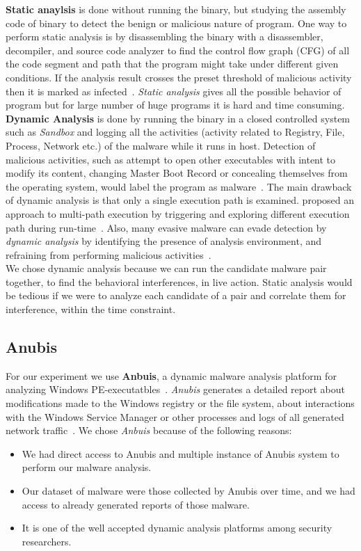 \textbf{Static anaylsis} is done without running the binary, but studying the assembly code of binary to detect the benign or malicious nature of program.
One way to perform static analysis is by disassembling the binary with a disassembler, decompiler, and source code analyzer to find the control flow graph (CFG) of all the code segment and path that the program might take under different given conditions.
If the analysis result crosses the preset threshold of malicious activity then it is marked as infected~\cite[]{sharma2014}.
\emph{Static analysis} gives all the possible behavior of program but for large number of huge programs it is hard and time consuming.\\

\textbf{Dynamic Analysis} is done by running the binary in a closed controlled system such as \emph{Sandbox} and logging all the activities (activity related to Registry, File, Process, Network etc.) of the malware while it runs in host.
Detection of malicious activities, such as attempt to open other executables with intent to modify its content, changing Master Boot Record or concealing themselves from the operating system, would label the program as malware~\cite[]{sharma2014}.
The main drawback of dynamic analysis is that only a single execution path is examined.
\citeauthor{chipounov2012s2e} proposed an approach to multi-path execution by triggering and exploring different execution path during run-time~\cite[]{chipounov2012s2e}.
Also, many evasive malware can evade detection by \emph{dynamic analysis} by identifying the presence of analysis environment, and refraining from performing malicious activities~\cite[]{barecloud}.
\\

We chose dynamic analysis because we can run the candidate malware pair together, to find the behavioral interferences, in live action.
Static analysis would be tedious if we were to analyze each candidate of a pair and correlate them for interference, within the time constraint.
\subsection{Anubis}
\label{sub:Anubis}
For our experiment we use \textbf{Anbuis}, a dynamic malware analysis platform for analyzing Windows PE-executatbles~\cite[]{anubis}.
\emph{Anubis} generates a detailed report about modifications made to the Windows registry or the file system, about interactions with the Windows Service Manager or other processes and logs of all generated network traffic~\cite[]{anubis}.
We chose \emph{Anbuis} because of the following reasons:
\begin{itemize}
  \item We had direct access to Anubis and multiple instance of Anubis system to perform our malware analysis.
  \item Our dataset of malware were those collected by Anubis over time, and we had access to already generated reports of those malware.
  \item It is one of the well accepted dynamic analysis platforms among security researchers.
\end{itemize}

